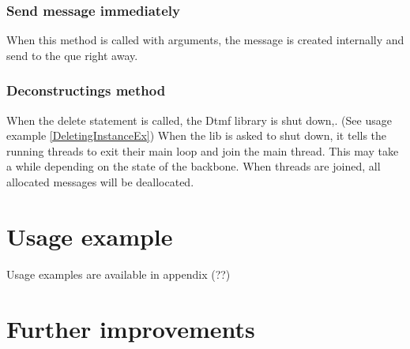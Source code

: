 \subsubsection{Send message immediately}
When this method is called with arguments, the message is created internally and send to the que right away.

\subsubsection{Deconstructings method}
When the delete statement is called, the Dtmf library is shut down,. (See usage example \ref{DeletingInstanceEx}) When the lib is asked to shut down, it tells the running threads to exit their main loop and join the main thread. This may take a while depending on the state of the backbone. When threads are joined, all allocated messages will be deallocated.

\section{Usage example}
Usage examples are available in appendix (??)

\section{Further improvements}




